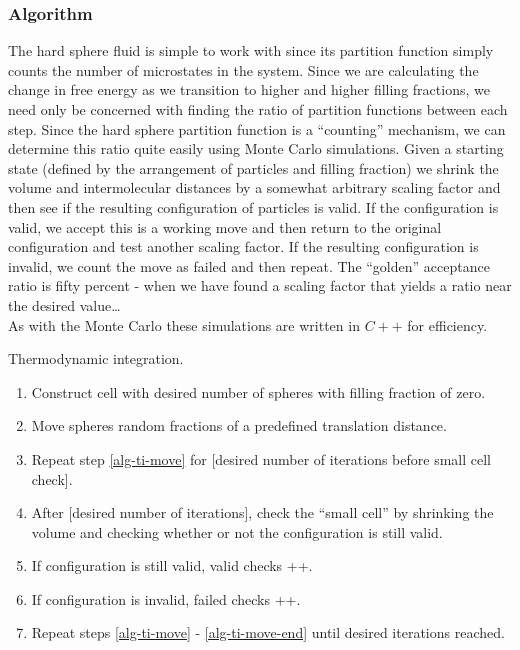 \documentclass[12pt]{article}
\newenvironment{alg}{\hrulefill\begin{enumerate}}{\end{enumerate}\hrulefill}
\begin{document}
\subsubsection{Algorithm}
The hard sphere fluid is simple to work with since its partition function simply counts the number of microstates in the system\cite{valeskethesis}. Since we are calculating the change in free energy as we transition to higher and higher filling fractions, we need only be concerned with finding the ratio of partition functions between each step. Since the hard sphere partition function is a ``counting'' mechanism, we can determine this ratio quite easily using Monte Carlo simulations. Given a starting state (defined by the arrangement of particles and filling fraction) we shrink the volume and intermolecular distances by a somewhat arbitrary scaling factor and then see if the resulting configuration of particles is valid. If the configuration is valid, we accept this is a working move and then return to the original configuration and test another scaling factor. If the resulting configuration is invalid, we count the move as failed and then repeat. The ``golden'' acceptance ratio is fifty percent - when we have found a scaling factor that yields a ratio near the desired value\dots\\

As with the Monte Carlo these simulations are written in $C++$ for efficiency. 

\begin{algorithm}[!b]
\caption{Thermodynamic integration.}
\label{alg:ti}
\begin{alg}
\item Construct cell with desired number of spheres with filling fraction of zero.
\item Move spheres random fractions of a predefined translation distance. \label{alg-ti-move}
\item Repeat step \ref{alg-ti-move} for [desired number of iterations before small cell check].
\item After [desired number of iterations], check the ``small cell'' by shrinking the volume and checking whether or not the configuration is still valid.
\item If configuration is still valid, valid checks ++.
\item If configuration is invalid, failed checks ++. \label{alg-ti-move-end}
\item Repeat steps \ref{alg-ti-move} - \ref{alg-ti-move-end} until desired iterations reached.

\end{alg}      
\end{algorithm}  
\end{document}

